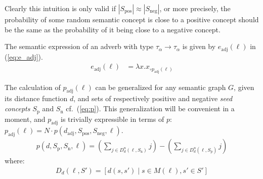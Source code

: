 Clearly this intuition is only valid if $|S_\mathrm{pos}| \approx |S_\mathrm{neg}|$, or more precisely, the probability of some random semantic concept is close to a positive concept should be the same as the probability of it being close to a negative concept. %

The semantic expression of an adverb with type $\tau_\alpha \to \tau_\alpha$ is given by $e_\mathrm{adj}(\ell)$ in (\ref{eq:e_adj}).
\begin{align}
	e_\mathrm{adj}(\ell) &=
    \lambda x . x_{\circ p_\mathrm{adj}(\ell)}
	\label{eq:e_adj}
\end{align}

The calculation of $p_\mathrm{adj}(\ell)$ can be generalized for any semantic graph $G$, given its distance function $d$, and sets of respectively positive and negative \emph{seed concepts} $S_\mathrm{p}$ and $S_\mathrm{n}$ cf.\ (\ref{eq:p}). This generalization will be convenient in a moment, and $p_\mathrm{adj}$ is trivially expressible in terms of $p$: $p_\mathrm{adj}(\ell) = N \cdot p(d_\mathrm{adj}, S_\mathrm{pos}, S_\mathrm{neg}, \ell)$.
\begin{align}
    p(d, S_\mathrm{p}, S_\mathrm{n}, \ell) =     	
    	\left( \sum_{j \in  D_d^n(\ell, S_\mathrm{n}) } j \right) -
		\left( \sum_{j \in  D_d^n(\ell, S_\mathrm{p}) } j \right)	
	\label{eq:p}
\end{align}
where:
\begin{align*}
	D_d(\ell, S') = \left[ d(s, s') \; | \; s \in M(\ell), s' \in S' \right] 
\end{align*}


